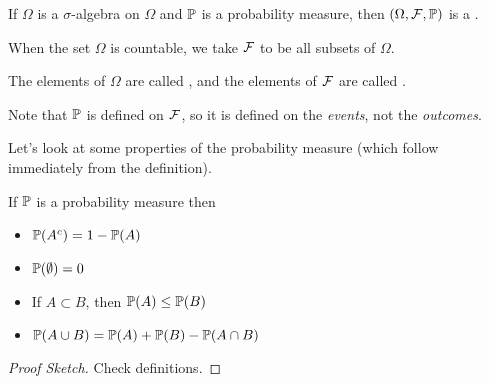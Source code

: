 \documentclass[a4paper]{scrreprt}
\begin{document}
\begin{definition}
	If $\Omega$ is a $\sigma$-algebra on $\Omega$ and $\PP$ is a probability measure, then $(\Omega, \mathcal{F}, \mathbb{P})$ is a .
\end{definition}

When the set $\Omega$ is countable, we take $\mathcal{F}$ to be all subsets of $\Omega$.

\begin{definition}
	The elements of $\Omega$ are called , and the elements of $\mathcal{F}$ are called .
\end{definition}

Note that $\PP$ is defined on $\mathcal{F}$, so it is defined on the \emph{events}, not the \emph{outcomes}. 

Let's look at some properties of the probability measure (which follow immediately from the definition).

\begin{proposition}[Properties of $\PP$]
	If $\PP$ is a probability measure then
	\begin{itemize}
		\item $\mathbb{P}(A^c) = 1 - \mathbb{P}(A)$
		\item $\mathbb{P}(\emptyset) = 0$
		\item If $A \subset B$, then $\mathbb{P}(A) \leq \mathbb{P}(B)$
		\item $\mathbb{P}(A \cup B) = \mathbb{P}(A) + \mathbb{P}(B) - \mathbb{P}(A \cap B)$
	\end{itemize}
\end{proposition}
\begin{proof}[Proof Sketch] Check definitions.
\end{proof}
\end{document}
